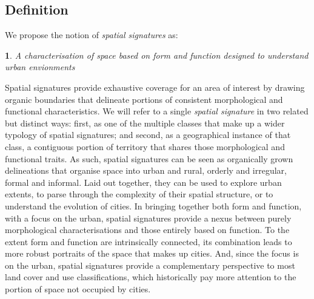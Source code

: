 \subsection{Definition}
\label{sec:ss_def}

We propose the notion of \textit{spatial signatures} as:

\newtheorem*{theorem}{}
\begin{theorem}
A characterisation of space based on form and function designed to understand
urban envionments
\end{theorem}

Spatial signatures provide exhaustive coverage for an area of interest by
drawing organic boundaries that delineate portions of consistent morphological
and functional characteristics.
%
We will refer to a single \textit{spatial signature} in two related but
distinct ways: first, as one of the multiple classes that make up a wider
typology of spatial signatures; and second, as a geographical instance of that
class, a contiguous portion of territory that shares those morphological and
functional traits.
As such, spatial signatures can be seen as organically grown delineations that
organise space into urban and rural, orderly and irregular, formal and informal.
%
Laid out together, they can be used to explore urban extents, to parse through
the complexity of their spatial structure, or to understand the evolution of
cities.
In bringing together both form and function, with a focus on the urban,
spatial signatures provide a nexus between purely morphological
characterisations and those entirely based on function.
%
To the extent form and function are intrinsically connected, its
combination leads to more robust portraits of the space that makes up cities.
And, since the focus is on the urban, spatial signatures provide a complementary
perspective to most land cover and use classifications, which historically
pay more attention to the portion of space not occupied by cities.

